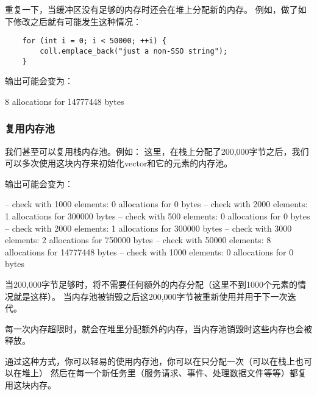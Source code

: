 重复一下，当缓冲区没有足够的内存时还会在堆上分配新的内存。
例如，做了如下修改之后就有可能发生这种情况：
\begin{lstlisting}
    for (int i = 0; i < 50000; ++i) {
        coll.emplace_back("just a non-SSO string");
    }
\end{lstlisting}
输出可能会变为：
\begin{blacklisting}
    8 allocations for 14777448 bytes
\end{blacklisting}

\subsubsection{复用内存池}
我们甚至可以复用栈内存池。例如：
这里，在栈上分配了200,000字节之后，我们可以多次使用这块内存来初始化vector和它的元素的内存池。

输出可能会变为：
\begin{blacklisting}
    -- check with 1000 elements:
    0 allocations for 0 bytes
    -- check with 2000 elements:
    1 allocations for 300000 bytes
    -- check with 500 elements:
    0 allocations for 0 bytes
    -- check with 2000 elements:
    1 allocations for 300000 bytes
    -- check with 3000 elements:
    2 allocations for 750000 bytes
    -- check with 50000 elements:
    8 allocations for 14777448 bytes
    -- check with 1000 elements:
    0 allocations for 0 bytes
\end{blacklisting}
当200,000字节足够时，将不需要任何额外的内存分配（这里不到1000个元素的情况就是这样）。
当内存池被销毁之后这200,000字节被重新使用并用于下一次迭代。

每一次内存超限时，就会在堆里分配额外的内存，当内存池销毁时这些内存也会被释放。

通过这种方式，你可以轻易的使用内存池，你可以在只分配一次（可以在栈上也可以在堆上）
然后在每一个新任务里（服务请求、事件、处理数据文件等等）都复用这块内存。

